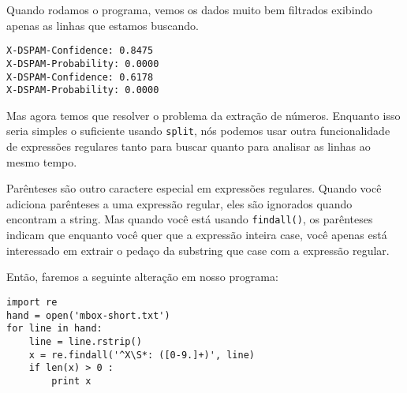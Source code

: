 Quando rodamos o programa, vemos os dados muito bem filtrados exibindo 
apenas as linhas que estamos buscando. 

\beforeverb
\begin{verbatim}
X-DSPAM-Confidence: 0.8475
X-DSPAM-Probability: 0.0000
X-DSPAM-Confidence: 0.6178
X-DSPAM-Probability: 0.0000
\end{verbatim}
\afterverb
%

Mas agora temos que resolver o problema da extração de números. Enquanto isso
seria simples o suficiente usando {\tt split}, nós podemos usar outra
funcionalidade de expressões regulares tanto para buscar quanto para analisar
as linhas ao mesmo tempo.


Parênteses são outro caractere especial em expressões regulares. Quando você
adiciona parênteses a uma expressão regular, eles são ignorados quando
encontram a string. Mas quando você está usando {\tt findall()}, os parênteses
indicam que enquanto você quer que a expressão inteira case, você apenas está
interessado em extrair o pedaço da substring que case com a expressão regular.


Então, faremos a seguinte alteração em nosso programa:

\beforeverb
\begin{verbatim}
import re
hand = open('mbox-short.txt')
for line in hand:
    line = line.rstrip()
    x = re.findall('^X\S*: ([0-9.]+)', line)
    if len(x) > 0 :
        print x
\end{verbatim}
\afterverb
%

